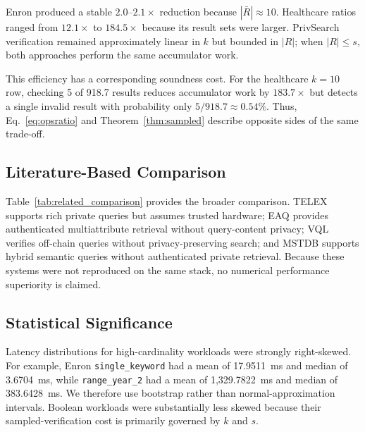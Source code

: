 \documentclass[journal]{IEEEtran}
\theoremstyle{tight}
\theoremstyle{remark}
\theoremstyle{plain}
\begin{document}
Enron produced a stable \(2.0\)--\(2.1\times\) reduction because \(|\bar R|\approx10\). Healthcare ratios ranged from \(12.1\times\) to \(184.5\times\) because its result sets were larger. PrivSearch verification remained approximately linear in \(k\) but bounded in \(|R|\); when \(|R|\leq s\), both approaches perform the same accumulator work.

This efficiency has a corresponding soundness cost. For the healthcare \(k=10\) row, checking 5 of 918.7 results reduces accumulator work by \(183.7\times\) but detects a single invalid result with probability only \(5/918.7\approx0.54\%\). Thus, Eq.~\eqref{eq:opsratio} and Theorem~\ref{thm:sampled} describe opposite sides of the same trade-off.

\subsection{Literature-Based Comparison}
\label{4H}

Table~\ref{tab:related_comparison} provides the broader comparison. TELEX supports rich private queries but assumes trusted hardware; EAQ provides authenticated multiattribute retrieval without query-content privacy; VQL verifies off-chain queries without privacy-preserving search; and MSTDB supports hybrid semantic queries without authenticated private retrieval. Because these systems were not reproduced on the same stack, no numerical performance superiority is claimed.

\subsection{Statistical Significance}
\label{4I}

Latency distributions for high-cardinality workloads were strongly right-skewed. For example, Enron \texttt{single\_keyword} had a mean of 17.9511~ms and median of 3.6704~ms, while \texttt{range\_year\_2} had a mean of 1{,}329.7822~ms and median of 383.6428~ms. We therefore use bootstrap rather than normal-approximation intervals. Boolean workloads were substantially less skewed because their sampled-verification cost is primarily governed by \(k\) and \(s\).
\end{document}
